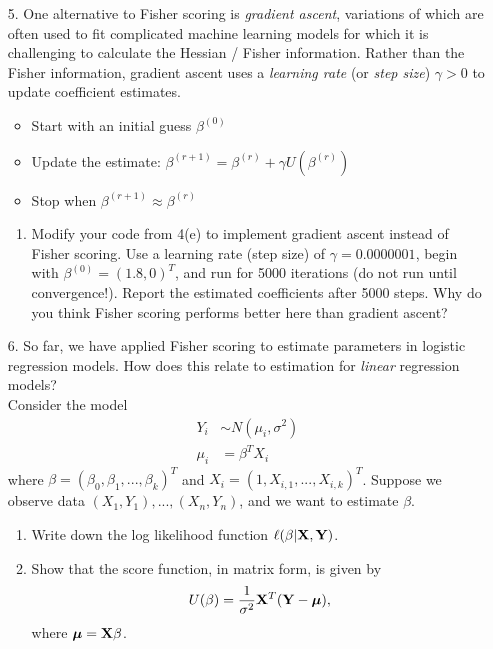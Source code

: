 \documentclass[11pt]{article}
\begin{document}
\begin{enumerate}
\begin{enumerate}
\end{enumerate}

\item[5.] One alternative to Fisher scoring is \textit{gradient ascent}, variations of which are often used to fit complicated machine learning models for which it is challenging to calculate the Hessian / Fisher information. Rather than the Fisher information, gradient ascent uses a \textit{learning rate} (or \textit{step size}) $\gamma > 0$ to update coefficient estimates. 

\begin{itemize}
\item Start with an initial guess $\beta^{(0)}$
\item Update the estimate: $\beta^{(r+1)} = \beta^{(r)} + \gamma U(\beta^{(r)})$
\item Stop when $\beta^{(r+1)} \approx \beta^{(r)}$
\end{itemize}

\begin{enumerate}
\item Modify your code from 4(e) to implement gradient ascent instead of Fisher scoring. Use a learning rate (step size) of $\gamma = 0.0000001$, begin with $\beta^{(0)} = (1.8, 0)^T$, and run for 5000 iterations (do not run until convergence!). Report the estimated coefficients after 5000 steps. Why do you think Fisher scoring performs better here than gradient ascent?
\end{enumerate}

\item[6.] So far, we have applied Fisher scoring to estimate parameters in logistic regression models. How does this relate to estimation for \textit{linear} regression models?\\

Consider the model
\begin{align*}
Y_i &\sim N(\mu_i, \sigma^2) \\
\mu_i &= \beta^T X_i
\end{align*}
where $\beta = (\beta_0, \beta_1, ..., \beta_k)^T$ and $X_i = (1, X_{i,1},...,X_{i,k})^T$. Suppose we observe data $(X_1,Y_1),...,(X_n,Y_n)$, and we want to estimate $\beta$.

\begin{enumerate}
\item Write down the log likelihood function $\ell(\beta | {\bf X}, {\bf Y})$.

\item Show that the score function, in matrix form, is given by
$$U(\beta) = \frac{1}{\sigma^2} {\bf X}^T ({\bf Y} - \bm{\mu}),$$
where $\bm{\mu} = {\bf X} \beta$.


\end{enumerate}
\end{enumerate}
\end{document}
